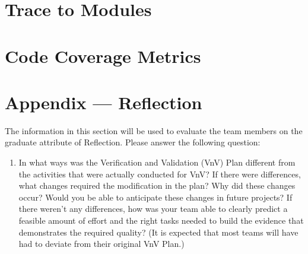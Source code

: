 \documentclass[12pt, titlepage]{article}
\begin{document}
\section{Trace to Modules}		

\section{Code Coverage Metrics}


%

\newpage{}
\section*{Appendix --- Reflection}

The information in this section will be used to evaluate the team members on the
graduate attribute of Reflection.  Please answer the following question:

\begin{enumerate}
  \item In what ways was the Verification and Validation (VnV) Plan different
  from the activities that were actually conducted for VnV?  If there were
  differences, what changes required the modification in the plan?  Why did
  these changes occur?  Would you be able to anticipate these changes in future
  projects?  If there weren't any differences, how was your team able to clearly
  predict a feasible amount of effort and the right tasks needed to build the
  evidence that demonstrates the required quality?  (It is expected that most
  teams will have had to deviate from their original VnV Plan.)
\end{enumerate}
\end{document}
